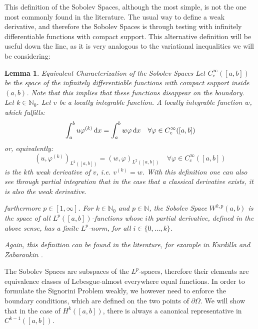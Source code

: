 \documentclass[headsepline,footsepline,footinclude=false,oneside,fontsize=11pt,paper=a4,listof=totoc,bibliography=totoc]{scrbook} %
\newtheorem{lemma}{Lemma}
\begin{document}
This definition of the Sobolev Spaces, although the most simple, is not the one most commonly found in the literature. The usual way to define a weak derivative, and therefore the Sobolev Spaces is through testing with infinitely differentiable functions with compact support. This alternative definition will be useful down the line, as it is very analogous to the variational inequalities we will be considering:

\begin{lemma} Equivalent Characterization of the Sobolev Spaces \newline
	Let $C_c^\infty([a,b])$ be the space of the infinitely differentiable functions with compact support inside $(a,b)$. Note that this implies that these functions disappear on the boundary. Let $k \in \mathbb{N}_0$. Let $v$ be a locally integrable function. A locally integrable function $w$, which fulfills:
	\begin{equation} \label{eq:weak_derivative_through_testing}
	\int_a^b u \varphi^{(k)} \dif x = \int_a^b w \varphi \dif x \quad \forall \varphi \in C_c^\infty([a,b])
	\end{equation}
	or, equivalently:
	\begin{equation}
		(u,\varphi^{(k)})_{L^2([a,b])} = (w,\varphi)_{L^2([a,b])} \quad \forall \varphi \in C_c^\infty([a,b])
	\end{equation}
	is the $k$th weak derivative of $v$, i.e. $v^{(k)} = w$. With this definition one can also see through partial integration that in the case that a classical derivative exists, it is also the weak derivative.
	
	 furthermore $p\in [1,\infty]$. For $k \in \mathbb{N}_0$ and $p \in \mathbb{N}$, the Sobolev Space $W^{k,p}(a,b)$ is the space of all $L^p([a,b])$-functions whose $i$th partial derivative, defined in the above sense, has a finite $L^p$-norm, for all $i \in \{0,\dots,k\}$. 
	
	
	Again, this definition can be found in the literature, for example in Kurdilla and Zabarankin \cite[Definition 3.2.3]{kurdila2005convex}.
\end{lemma}

The Sobolev Spaces are subspaces of the $L^p$-spaces, therefore their elements are equivalence classes of Lebesgue-almost everywhere equal functions. In order to formulate the Signorini Problem weakly, we however need to enforce the boundary conditions, which are defined on the two points of $\partial \Omega$. We will show that in the case of $H^k([a,b])$, there is always a canonical representative in $C^{k-1}([a,b])$.
\end{document}
